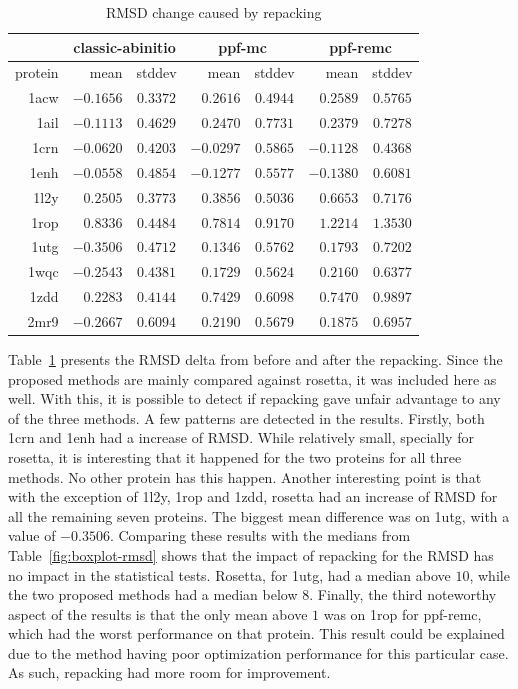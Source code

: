 \begin{table}
  \centering
  \begin{tabular}{r|r|c||r|c||r|c}
            & \multicolumn{2}{c}{classic-abinitio} & \multicolumn{2}{||c}{ppf-mc} & \multicolumn{2}{||c}{ppf-remc} \\ \hline
    protein & mean      & stddev   & mean      & stddev   & mean      & stddev   \\ \hline \hline
    1acw    & $-0.1656$ & $0.3372$ & $0.2616$  & $0.4944$ & $0.2589$  & $0.5765$ \\ \hline
    1ail    & $-0.1113$ & $0.4629$ & $0.2470$  & $0.7731$ & $0.2379$  & $0.7278$ \\ \hline
    1crn    & $-0.0620$ & $0.4203$ & $-0.0297$ & $0.5865$ & $-0.1128$ & $0.4368$ \\ \hline
    1enh    & $-0.0558$ & $0.4854$ & $-0.1277$ & $0.5577$ & $-0.1380$ & $0.6081$ \\ \hline
    1l2y    & $0.2505$  & $0.3773$ & $0.3856$  & $0.5036$ & $0.6653$  & $0.7176$ \\ \hline
    1rop    & $0.8336$  & $0.4484$ & $0.7814$  & $0.9170$ & $1.2214$  & $1.3530$ \\ \hline
    1utg    & $-0.3506$ & $0.4712$ & $0.1346$  & $0.5762$ & $0.1793$  & $0.7202$ \\ \hline
    1wqc    & $-0.2543$ & $0.4381$ & $0.1729$  & $0.5624$ & $0.2160$  & $0.6377$ \\ \hline
    1zdd    & $0.2283$  & $0.4144$ & $0.7429$  & $0.6098$ & $0.7470$  & $0.9897$ \\ \hline
    2mr9    & $-0.2667$ & $0.6094$ & $0.2190$  & $0.5679$ & $0.1875$  & $0.6957$ \\ \hline
  \end{tabular}
  \caption{RMSD change caused by repacking}
  \label{tab:repack-impact-rmsd}
\end{table}

Table~\ref{tab:repack-impact-rmsd} presents the RMSD delta from before and after
the repacking. Since the proposed methods are mainly compared against rosetta,
it was included here as well. With this, it is possible to detect if repacking
gave unfair advantage to any of the three methods. A few patterns are detected
in the results. Firstly, both 1crn and 1enh had a increase of RMSD. While
relatively small, specially for rosetta, it is interesting that it happened for
the two proteins for all three methods. No other protein has this happen.
Another interesting point is that with the exception of 1l2y, 1rop and 1zdd,
rosetta had an increase of RMSD for all the remaining seven proteins. The
biggest mean difference was on 1utg, with a value of $-0.3506$. Comparing these
results with the medians from Table~\ref{fig:boxplot-rmsd} shows that the
impact of repacking for the RMSD has no impact in the statistical tests. Rosetta,
for 1utg, had a median above $10$, while the two proposed methods had a median
below $8$. Finally, the third noteworthy aspect of the results is that the only
mean above $1$ was on 1rop for ppf-remc, which had the worst performance
on that protein. This result could be explained due to the method having poor
optimization performance for this particular case. As such, repacking had more
room for improvement.


